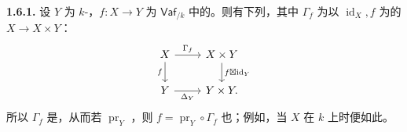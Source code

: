 \textbf{1.6.1.} 设 $Y$ 为 $k$-，$f:X\to Y$ 为 $\mathsf{Vaf}_{/k}$ 中的。则有下列，其中 $\Gamma_f$ 为以 $\operatorname{id}_X,f$ 为的 $X\to X\times Y$：
\[
\begin{tikzcd}
 X\arrow[r,"\Gamma_f"]\arrow[d,"f"']&X\times Y\arrow[d,"{f\boxtimes\operatorname{id}_Y}"]\\
 Y\arrow[r,"\Delta_Y"']&Y\times Y.
\end{tikzcd}
\]
所以 $\Gamma_f$ 是，从而若 $\operatorname{pr}_Y$ ，则 $f=\operatorname{pr}_Y\circ\Gamma_f$ 也；例如，当 $X$ 在 $k$ 上时便如此。

